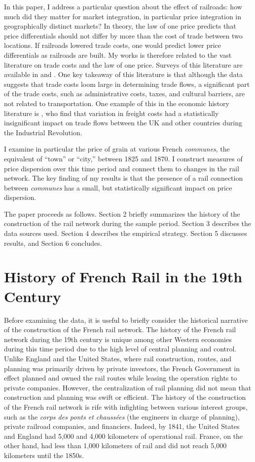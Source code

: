 \documentclass[12pt,twoside]{article}
\begin{document}
In this paper, I address a particular question about the effect of railroads: how much did they matter for market integration, in particular price integration in geographically distinct markets?
In theory, the law of one price predicts that price differentials should not differ by more than the cost of trade between two locations.
If railroads lowered trade costs, one would predict lower price differentials as railroads are built.
My works is therefore related to the vast literature on trade costs and the law of one price.
Surveys of this literature are available in \cite{anderson} and \cite{head}.
One key takeaway of this literature is that although the data suggests that trade costs loom large in determining trade flows, a significant part of the trade costs, such as administrative costs, taxes, and cultural barriers, are not related to transportation.
One example of this in the economic history literature is \cite{jacks}, who find that variation in freight costs had a statistically insignificant impact on trade flows between the UK and other countries during the Industrial Revolution.

I examine in particular the price of grain at various French \emph{communes}, the equivalent of ``town'' or ``city,'' between 1825 and 1870.
I construct measures of price dispersion over this time period and connect them to changes in the rail network.
The key finding of my results is that the presence of a rail connection between \emph{communes} has a small, but statistically significant impact on price dispersion.

The paper proceeds as follows. Section 2 briefly summarizes the history of the construction of the rail network during the sample period. Section 3 describes the data sources used. Section 4 describes the empirical strategy. Section 5 discusses results, and Section 6 concludes.

\section{History of French Rail in the 19th Century}

Before examining the data, it is useful to briefly consider the historical narrative of the construction of the French rail network.
The history of the French rail network during the 19th century is unique among other Western economies during this time period due to the high level of central planning and control.
Unlike England and the United States, where rail construction, routes, and planning was primarily driven by private investors, the French Government in effect planned and owned the rail routes while leasing the operation rights to private companies.
However, the centralization of rail planning did not mean that construction and planning was swift or efficient.
The history of the construction of the French rail network is rife with infighting between various interest groups, such as the \emph{corps des ponts et chauss\'{e}es} (the engineers in charge of planning), private railroad companies, and financiers.
Indeed, by 1841, the United States and England had 5,000 and 4,000 kilometers of operational rail.
France, on the other hand, had less than 1,000 kilometers of rail and did not reach 5,000 kilometers until the 1850s.
\end{document}
